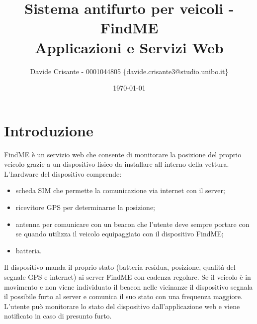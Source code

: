 \documentclass{report}
\title{
    Sistema antifurto per veicoli - FindME \\
    \large Applicazioni e Servizi Web
}
\author{Davide Crisante - 0001044805 \{davide.crisante3@studio.unibo.it\}}
\date{\today}
\begin{document}
\maketitle

\section{Introduzione}
FindME è un servizio web che consente di monitorare la posizione del proprio veicolo grazie a un dispositivo fisico da installare all interno della vettura.\\
L'hardware del dispositivo comprende:
\begin{itemize}
    \item scheda SIM che permette la comunicazione via internet con il server;
    \item ricevitore GPS per determinarne la posizione;
    \item antenna per comunicare con un beacon che l'utente deve sempre portare con se quando utilizza il veicolo equipaggiato con il dispositivo FindME;
    \item batteria.
\end{itemize}

Il dispositivo manda il proprio stato (batteria residua, posizione, qualità del segnale GPS e internet) ai server FindME con cadenza regolare. Se il veicolo è in movimento e non viene individuato il beacon nelle vicinanze il dispositivo segnala il possibile furto al server e comunica il suo stato con una frequenza maggiore.\\
L'utente può monitorare lo stato del dispositivo dall'applicazione web e viene notificato in caso di presunto furto.
\newpage
\end{document}
